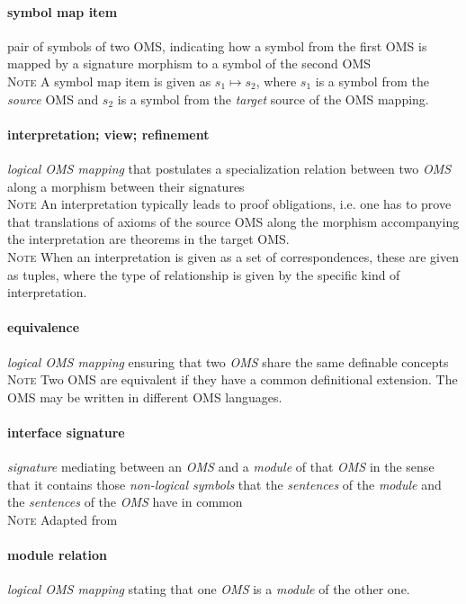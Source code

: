 \documentclass[10pt,%
\ifpretendfinal
final%
\else
draft%
\fi,
]{scrreprt}
\makeatletter
\newcommand*{\ie}{i.e.\@\xspace}
\newcommand*{\termref}[1]{\textit{#1}}
\newcommand*{\synonym}{; }
\newcommand{\termdefinition}[2]{\paragraph{#1} #2}
\newenvironment{definitions}[0]{\medskip }{}
\newenvironment{note}[0]{\ \\ \textsc{Note} \quad}{}
\newcommand{\red}[1]{{\color{red}{#1}}}
\makeatother
\begin{document}
\begin{definitions}
 \termdefinition{symbol map item}{pair of symbols of two OMS, indicating how a symbol from the first OMS is mapped by a signature morphism to a symbol of the second OMS}
 \begin{note}
   A symbol map item is given as $s_1 \mapsto s_2$, where $s_1$ is a symbol from the \emph{source} OMS 
   and $s_2$ is a symbol from the \emph{target} source of the OMS mapping.
 \end{note}

  \termdefinition{interpretation\synonym view\synonym refinement}{\termref{logical OMS mapping} that postulates a
specialization relation
 between two \termref{OMS}} along a morphism between their signatures
  \begin{note}
    An interpretation typically leads to proof obligations, \ie one has to prove that 
  translations of axioms of the source OMS along the morphism accompanying the interpretation are theorems in the target OMS.
  \end{note}
  \begin{note}
    When an interpretation is given as a set of correspondences, these are given as tuples, where the type of relationship is given by the specific kind of interpretation. \ednote{\red{I don't understand this sentence.}}
  \end{note}

  \termdefinition{equivalence}
{\termref{logical OMS mapping} ensuring that two \termref{OMS} share the
  same definable concepts}
  \begin{note}
    Two OMS are equivalent if they have a common definitional extension.
    The OMS may be written in different OMS languages.
  \end{note}

  \termdefinition{interface signature}{\termref{signature} mediating between an \termref{OMS} and a \termref{module} of that \termref{OMS} in the sense that it contains those \termref{non-logical symbols} that the \termref{sentences} of the \termref{module} and the \termref{sentences} of the \termref{OMS} have in common}
  \begin{note}
    Adapted from \cite{CuencaGrauEtAl:ExtractingModulesOntologies2007}
  \end{note}

  \termdefinition{module relation}{\termref{logical OMS mapping} stating that one \termref{OMS} is a \termref{module} of the other one.}


\end{definitions}
\end{document}

